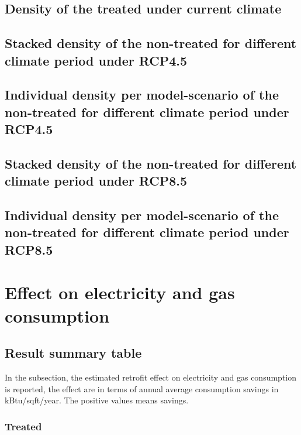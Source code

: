 \documentclass[12pt]{article}
\begin{document}
\subsection{Density of the treated under current climate}

\subsection{Stacked density of the non-treated for different climate period under RCP4.5}

\subsection{Individual density per model-scenario of the non-treated for different
  climate period under RCP4.5}

\subsection{Stacked density of the non-treated for different climate period under RCP8.5}

\subsection{Individual density per model-scenario of the non-treated for different
  climate period under RCP8.5}


\section{Effect on electricity and gas consumption}
\subsection{Result summary table}
In the subsection, the estimated retrofit effect on electricity and gas
consumption is reported, the effect are in terms of annual average consumption
savings in kBtu/sqft/year. The positive values means savings.
\subsubsection{Treated}








\end{document}
